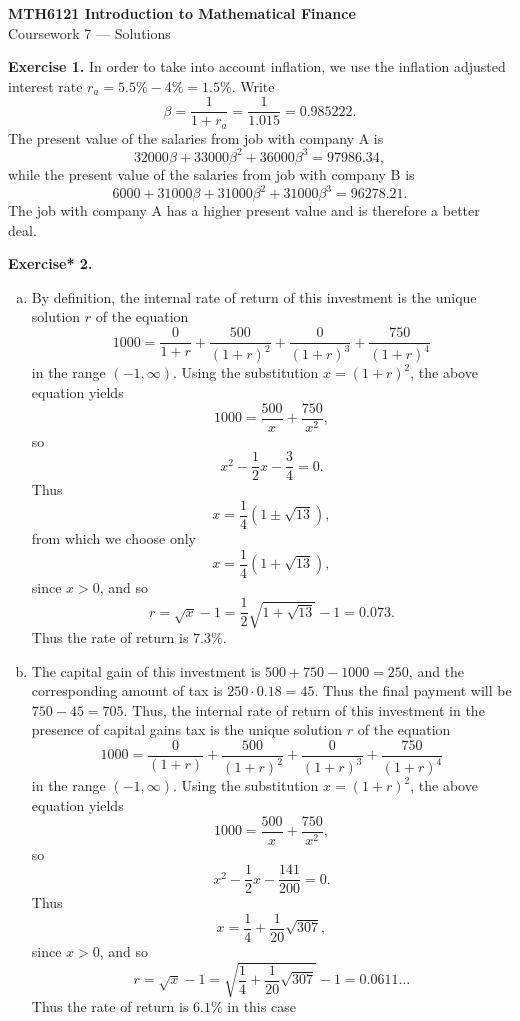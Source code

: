 \documentclass[11pt,a4paper]{article}
\begin{document}
    \begin{center}
        \LARGE\textbf{MTH6121 Introduction to Mathematical Finance}\\
        Coursework 7 — Solutions
    \end{center}
    \textbf{Exercise 1.} In order to take into account inflation, we use the inflation adjusted interest rate $r_a = 5.5\% − 4\% = 1.5\%$. Write
    $$ \beta = \frac{1}{1+r_a} = \frac{1}{1.015} = 0.985222. $$
    The present value of the salaries from job with company A is
    $$ 32000\beta + 33000\beta^2 + 36000\beta^3 = 97986.34 ,$$
    while the present value of the salaries from job with company B is
    $$6000 + 31000\beta + 31000\beta^2 + 31000\beta^3 = 96278.21 .$$
    The job with company A has a higher present value and is therefore a better deal.\par
    \textbf{Exercise* 2.} 
    \begin{enumerate}[(a)]
        \item By definition, the internal rate of return of this investment is the unique solution $r$ of the equation
        $$
        1000 = \frac{0}{1+r} + \frac{500}{(1+r)^2} + \frac{0}{(1+r)^3} + \frac{750}{(1+r)^4}
        $$
        in the range $(−1,\infty)$. Using the substitution $x = (1 + r)^2$, the above equation yields
        $$
        1000 = \frac{500}{x} + \frac{750}{x^2},
        $$
        so
        $$
        x^2-\frac{1}{2}x-\frac{3}{4} = 0.
        $$
        Thus
        $$
        x = \frac{1}{4}(1 \pm \sqrt{13}),
        $$
        from which we choose only
        $$
        x = \frac{1}{4}(1 + \sqrt{13}),
        $$
        since $x > 0$, and so
        $$
        r = \sqrt{x} - 1 = \frac{1}{2}\sqrt{1+\sqrt{13}}-1 = 0.073.
        $$
        Thus the rate of return is $7.3\%$.
        \item The capital gain of this investment is $500 + 750−1000 = 250$, and the corresponding amount of tax is $250 \cdot 0.18 = 45$. Thus the final payment will be 
        $750 − 45 = 705$. Thus, the internal rate of return of this investment in the presence of capital gains tax is the unique solution $r$ of the equation
        $$
        1000 = \frac{0}{(1+r)} + \frac{500}{(1+r)^2}+\frac{0}{(1+r)^3}+\frac{750}{(1+r)^4}
        $$
        in the range $(−1,\infty)$. Using the substitution $x = (1 + r)^2$, the above equation yields
        $$
        1000 = \frac{500}{x} + \frac{750}{x^2},
        $$
        so
        $$
        x^2 - \frac{1}{2}x - \frac{141}{200} = 0. 
        $$
        Thus
        $$
        x = \frac{1}{4} + \frac{1}{20}\sqrt{307},
        $$
        since $x > 0$, and so
        $$
        r = \sqrt{x}-1=\sqrt{\frac{1}{4}+\frac{1}{20}\sqrt{307}}-1 = 0.0611\ldots
        $$
        Thus the rate of return is $6.1\%$ in this case
    \end{enumerate}
\end{document}
